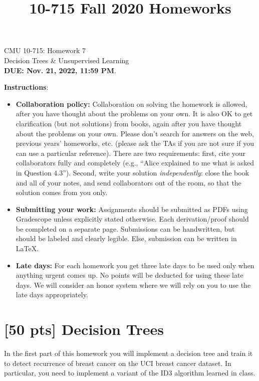 \documentclass{article}
\title{10-715 Fall 2020 Homeworks}
\begin{document}
\begin{center}
{\Large CMU 10-715: Homework 7}\\
Decision Trees \& Unsupervised Learning \\
{\bf DUE: Nov. 21, 2022, 11:59 PM}.\\
\end{center}


\textbf{\large Instructions}:
\begin{itemize}
    \item \textbf{Collaboration policy:} Collaboration on solving the homework is allowed, after you have thought about the problems on your own. It is also OK to get clarification (but not solutions) from books, again after you have thought about the problems on your own. Please don’t search for answers on the web, previous years’ homeworks, etc. (please ask the TAs if you are not sure if you can use a particular reference). There are two requirements: first, cite your collaborators fully and completely (e.g., ``Alice explained to me what is asked in Question 4.3''). Second, write your solution \emph{independently}: close the book and all of your notes, and send collaborators out of the room, so that the solution comes from you only. 
    \item \textbf{Submitting your work:} Assignments should be submitted as PDFs using Gradescope unless explicitly stated otherwise. Each derivation/proof should be completed on a separate page. Submissions can be handwritten, but should be labeled and clearly legible. Else, submission can be written in LaTeX.
    
    \item \textbf{Late days:} For each homework you get three late days to be used only when anything urgent comes up. No points will be deducted for using these late days. We will consider an honor system where we will rely on you to use the late days appropriately.
    

\end{itemize}

\newpage
\section{ [50 pts] Decision Trees}

In the first part of this homework you will implement a decision tree and train it to detect recurrence of breast cancer on the UCI breast cancer dataset. In particular, you need to implement a variant of the ID3 algorithm learned in class.
\end{document}
